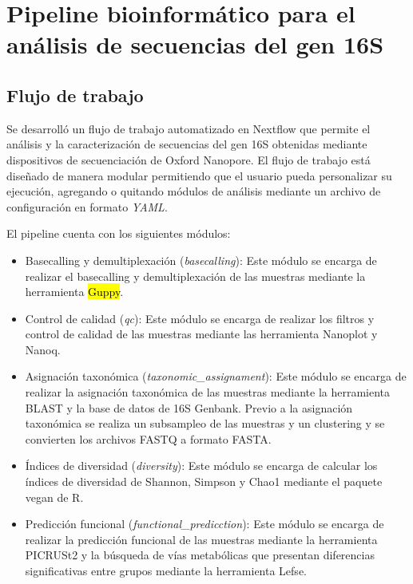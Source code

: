 \chapter{Pipeline bioinformático para el análisis de secuencias del gen 16S}

\section{Flujo de trabajo}
Se desarrolló un flujo de trabajo automatizado en Nextflow que permite el análisis y la caracterización de secuencias del gen 16S obtenidas mediante dispositivos de secuenciación de Oxford Nanopore. 
El flujo de trabajo está diseñado de manera modular permitiendo que el usuario pueda personalizar su ejecución, agregando o quitando módulos de análisis mediante un archivo de configuración en formato \textit{YAML}.  

El pipeline cuenta con los siguientes módulos: 
\begin{itemize}
    \item Basecalling y demultiplexación (\textit{basecalling}): Este módulo se encarga de realizar el basecalling y demultiplexación de las muestras mediante la herramienta \hl{Guppy}.
    \item Control de calidad (\textit{qc}): Este módulo se encarga de realizar los filtros y control de calidad de las muestras mediante las herramienta Nanoplot y Nanoq.
    \item Asignación taxonómica (\textit{taxonomic\_assignament}): Este módulo se encarga de realizar la asignación taxonómica de las muestras mediante la herramienta BLAST y la base de datos de 16S Genbank. Previo a la asignación taxonómica se realiza un subsampleo de las muestras y un clustering y se convierten los archivos FASTQ a formato FASTA.
    \item Índices de diversidad (\textit{diversity}): Este módulo se encarga de calcular los índices de diversidad de Shannon, Simpson y Chao1 mediante el paquete vegan de R.
    \item Predicción funcional (\textit{functional\_predicction}): Este módulo se encarga de realizar la predicción funcional de las muestras mediante la herramienta PICRUSt2 y la búsqueda de vías metabólicas que presentan diferencias significativas entre grupos mediante la herramienta Lefse.
\end{itemize}

